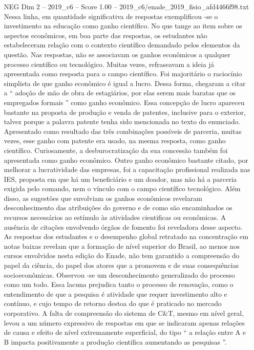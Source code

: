 \begin{textsample}{NEG Dim 2 – 2019\_c6 – Score 1.00 – 2019\_c6/enade\_2019\_fisio\_afd4466f98.txt}
Nessa linha, em quantidade significativa de respostas exemplificou -se o investimento na educação como ganho científico.
No que tange ao item sobre os aspectos econômicos, em boa parte das respostas, os estudantes não estabeleceram relação com o contexto científico demandado pelos elementos da questão.
Nas respostas, não se associavam os ganhos econômicos a qualquer processo científico ou tecnológico.
Muitas vezes, refraseavam a ideia já apresentada como resposta para o campo científico.
Foi majoritário o raciocínio simplista de que ganho econômico é igual a lucro.
Dessa forma, chegaram a citar a “ adoção de mão de obra de estagiários, por elas serem mais baratas que os empregados formais ” como ganho econômico.
Essa concepção de lucro apareceu bastante na proposta de produção e venda de patentes, inclusive para o exterior, talvez porque a palavra patente tenha sido mencionada no texto do enunciado.
Apresentado como resultado das três combinações possíveis de parceria, muitas vezes, esse ganho com patente era usado, na mesma resposta, como ganho científico.
Curiosamente, a desburocratização da sua concessão também foi apresentada como ganho econômico.
Outro ganho econômico bastante citado, por melhorar a lucratividade das empresas, foi a capacitação profissional realizada nas IES, proposta em que há um beneficiário e um doador, mas não há a parceria exigida pelo comando, nem o vínculo com o campo científico tecnológico.
Além disso, as sugestões que envolviam os ganhos econômicos revelaram desconhecimento das atribuições do governo e de como são encaminhados os recursos necessários ao estímulo às atividades cientificas ou econômicas.
A ausência de citações envolvendo órgãos de fomento foi reveladora desse aspecto.
As respostas dos estudantes e o desempenho global retratado na concentração em notas baixas revelam que a formação de nível superior do Brasil, ao menos nos cursos envolvidos nesta edição do Enade, não tem garantido a compreensão do papel da ciência, do papel dos atores que a promovem e de suas consequências socioeconômicas.
Observou -se um desconhecimento generalizado do processo como um todo.
Essa lacuna prejudica tanto o processo de renovação, como o entendimento de que a pesquisa é atividade que requer investimento alto e contínuo, e cujo tempo de retorno destoa do que é praticado no mercado corporativo.
A falta de compreensão do sistema de C\&T, mesmo em nível geral, levou a um número expressivo de respostas em que se indicaram apenas relações de causa e efeito de nível extremamente superficial, do tipo “ a relação entre A e B impacta positivamente a produção científica aumentando as pesquisas ”.

\end{textsample}
